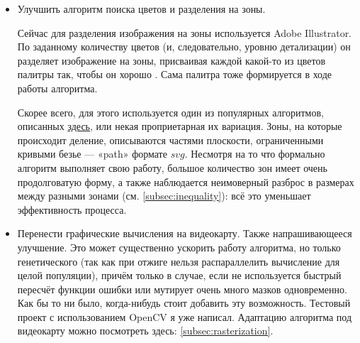 \documentclass[11pt]{article}
\begin{document}
\begin{itemize}
        \item Улучшить алгоритм поиска цветов и разделения на зоны.

                Сейчас для разделения изображения на зоны используется Adobe Illustrator.
                По заданному количеству цветов (и, следовательно, уровню детализации) он разделяет изображение на зоны,
                присваивая каждой какой-то из цветов палитры так, чтобы он хорошо .
                Сама палитра тоже формируется в ходе работы алгоритма.

                Скорее всего, для этого используется один из популярных алгоритмов, описанных \href{https://en.wikipedia.org/wiki/Color_quantization}{здесь}, или некая проприетарная их вариация.
                Зоны, на которые происходит деление, описываются частями плоскости, ограниченными кривыми безье — «path»  формате $svg$.
                Несмотря на то что формально алгоритм выполняет свою работу, большое количество зон имеет очень продолговатую форму,
                а также наблюдается неимоверный разброс в размерах между разными зонами (см. \ref{subsec:inequality}):
                всё это уменьшает эффективность процесса.


        \item Перенести графические вычисления на видеокарту.
                Также напрашивающееся улучшение.
                Это может существенно ускорить работу алгоритма, но только генетического (так как при отжиге нельзя распараллелить вычисление для целой популяции),
                причём только в случае, если не используется быстрый пересчёт функции ошибки или мутирует очень много мазков одновременно.
                Как бы то ни было, когда-нибудь стоит добавить эту возможность.
                Тестовый проект с использованием OpenCV я уже написал.
                Адаптацию алгоритма под видеокарту можно посмотреть здесь: \ref{subsec:rasterization}.



    \end{itemize}
\end{document}
